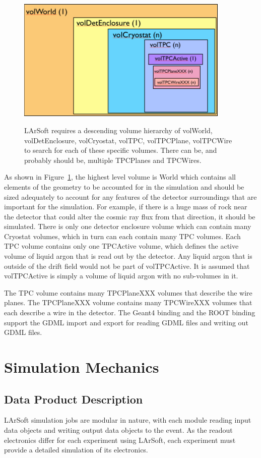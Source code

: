 \documentclass[12pt]{elsarticle}
\begin{document}
\begin{figure}[h]
\center
\caption{LArSoft requires a descending volume hierarchy of volWorld, volDetEnclosure, volCryostat, volTPC, volTPCPlane, volTPCWire to search for each of these specific volumes. There can be, and probably should be, multiple TPCPlanes and TPCWires.}
\includegraphics[width=4.0in]{./imgs/geometry_volumes.png}
\label{geo-vol.img}
\end{figure}

As shown in Figure~\ref{geo-vol.img},
the highest level volume is World which contains all elements of the geometry to be accounted for in the simulation and should be sized adequately to account for any features of the detector surroundings that are important for the simulation. For example, if there is a huge mass of rock near the detector that could alter the cosmic ray flux from that direction, it should be simulated. There is only one detector enclosure volume which can contain many Cryostat volumes, which in turn can each contain many TPC volumes. Each TPC volume contains only one TPCActive volume, which defines the active volume of liquid argon that is read out by the detector. Any liquid argon that is outside of the drift field would not be part of volTPCActive. It is assumed that volTPCActive is simply a volume of liquid argon with no sub-volumes in it. 

The TPC volume contains many TPCPlaneXXX volumes that describe the wire planes. The TPCPlaneXXX volume contains many TPCWireXXX volumes that each describe a wire in the detector. The Geant4 binding and the ROOT binding support the GDML import and export for reading GDML files and writing out GDML files.
                    
\section{Simulation Mechanics}

\subsection{Data Product Description}
LArSoft simulation jobs are modular in nature, with each module reading input data objects and writing output data objects to the event.  
As the readout electronics differ for each experiment using LArSoft, each
experiment must provide a detailed simulation of its electronics. 
\end{document}
